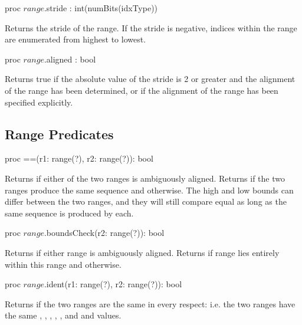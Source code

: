 \begin{protohead}
proc $range$.stride : int(numBits(idxType))
\end{protohead}
\begin{protobody}
Returns the stride of the range.  If the stride is negative, indices within the
range are enumerated from highest to lowest.
\end{protobody}

\begin{protohead}
proc $range$.aligned : bool
\end{protohead}
\begin{protobody}
Returns true if the absolute value of the stride is 2 or greater and the
alignment of the range has been determined, or if the alignment of the range has
been specified explicitly.  
\end{protobody}

\subsection{Range Predicates}

\begin{protohead}
proc ==(r1: range(?), r2: range(?)): bool
\end{protohead}
\begin{protobody}
Returns  if either of the two ranges is ambiguously aligned.
Returns  if the two ranges produce the same sequence
and  otherwise.  The high and low bounds can differ between the two
ranges, and they will still compare equal as long as the same sequence is
produced by each.
\end{protobody}

\begin{protohead}
proc $range$.boundsCheck(r2: range(?)): bool
\end{protohead}
\begin{protobody}
Returns  if either range is ambiguously aligned.
Returns  if range  lies entirely within this range
and  otherwise.  
\end{protobody}

\begin{protohead}
proc $range$.ident(r1: range(?), r2: range(?)): bool
\end{protohead}
\begin{protobody}
Returns  if the two ranges are the same in every respect: i.e. the
two ranges have the same ,
, , , ,  and
 and  values.
\end{protobody}

